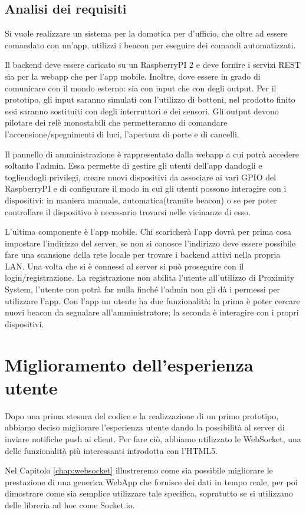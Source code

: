 \subsection{Analisi dei requisiti}
Si vuole realizzare un sistema per la domotica per d'ufficio, che oltre ad essere comandato con un'app, utilizzi i beacon per eseguire dei comandi automatizzati.

Il backend deve essere caricato su un RaspberryPI 2 e deve fornire i servizi REST sia per la webapp che per l'app mobile. 
Inoltre, dove essere in grado di comunicare con il mondo esterno: sia con input che con degli output.
Per il prototipo, gli input saranno simulati con l'utilizzo di bottoni, nel prodotto finito essi saranno sostituiti con degli interruttori e dei sensori.
Gli output devono pilotare dei relè monostabili che permetteranno di comandare l'accensione/spegnimenti di luci, l'apertura di porte e di cancelli.

Il pannello di amministrazione è rappresentato dalla webapp a cui potrà accedere soltanto l'admin. 
Essa permette di gestire gli utenti dell'app dandogli e togliendogli privilegi, creare nuovi dispositivi da associare ai vari GPIO del RaspberryPI e di configurare il modo in cui gli utenti possono interagire con i dispositivi: in maniera manuale, automatica(tramite beacon) o se per poter controllare il dispositivo è necessario trovarsi nelle vicinanze di esso. 

L'ultima componente è l'app mobile. 
Chi scaricherà l'app dovrà per prima cosa impostare l'indirizzo del server, se non si conosce l'indirizzo deve essere possibile fare una scansione della rete locale per trovare i backend attivi nella propria LAN. 
Una volta che si è connessi al server si può proseguire con il login/registrazione. 
La registrazione non abilita l'utente all'utilizzo di Proximity System, l'utente non potrà far nulla finché l'admin non gli dà i permessi per utilizzare l'app. 
Con l'app un utente ha due funzionalità: la prima è poter cercare nuovi beacon da segnalare all'amministratore; la seconda è interagire con i propri dispositivi.

\section{Miglioramento dell'esperienza utente}
Dopo una prima stesura del codice e la realizzazione di un primo prototipo,
abbiamo deciso migliorare l'esperienza utente dando la possibilità al server di inviare notifiche push ai client.
Per fare ciò, abbiamo utilizzato le WebSocket, una delle funzionalità più interessanti introdotta con l'HTML5.

Nel Capitolo \ref{chap:websocket} illustreremo come sia possibile migliorare le  prestazione di una generica WebApp che fornisce dei dati in tempo reale, per poi dimostrare come sia semplice utilizzare tale specifica, sopratutto se si utilizzano delle libreria ad hoc come Socket.io. 